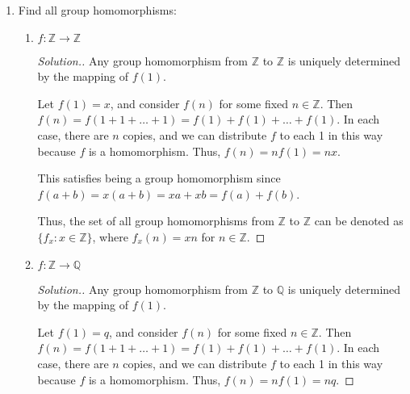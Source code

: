 \documentclass{article}
\newcommand{\sk}{\smallskip}
\newcommand{\Z}{\mathbb{Z}}
\newcommand{\Q}{\mathbb{Q}}
\begin{document}
\begin{enumerate}
\begin{enumerate}
\begin{proof}[Solution.]
        \sk

        So, the unique homomorphism from $\Z$ to $G$ is defined by $f(n) = ng$ where $f(1) = g$. This is a homomorphism since $f(n + m) = (n + m)g = ng + mg = f(n) + f(m)$, and so $f$ is operation preserving. 
            
        \end{proof}
    \end{enumerate}



    \item Find all group homomorphisms:
    \begin{enumerate}
        \item $f: \Z \rightarrow \Z$
            \begin{proof}[Solution.]
            Any group homomorphism from $\Z$ to $\Z$ is uniquely determined by the mapping of $f(1)$. 

            \sk

            Let $f(1) = x$, and consider $f(n)$ for some fixed $n \in \Z$. Then $f(n) = f(1 + 1 + \dots + 1) = f(1) + f(1) + \dots + f(1)$. In each case, there are $n$ copies, and we can distribute $f$ to each 1 in this way because $f$ is a homomorphism. Thus, $f(n) = nf(1) = nx$. 

            \sk

            This satisfies being a group homomorphism since $f(a+b) = x(a+b) = xa + xb = f(a) + f(b)$.

            \sk
            
            Thus, the set of all group homomorphisms from $\Z$ to $\Z$ can be denoted as $\{f_x : x \in \Z \}$, where $f_x(n) = xn$ for $n \in \Z$.
            
            \end{proof} 
        \item $f: \Z \rightarrow \Q$
            \begin{proof}[Solution.]
            Any group homomorphism from $\Z$ to $\Q$ is uniquely determined by the mapping of $f(1)$. 

            \sk

            Let $f(1) = q$, and consider $f(n)$ for some fixed $n \in \Z$. Then $f(n) = f(1 + 1 + \dots + 1) = f(1) + f(1) + \dots + f(1)$. In each case, there are $n$ copies, and we can distribute $f$ to each 1 in this way because $f$ is a homomorphism. Thus, $f(n) = nf(1) = nq$. 


\end{proof}
\end{enumerate}
\end{enumerate}
\end{document}
